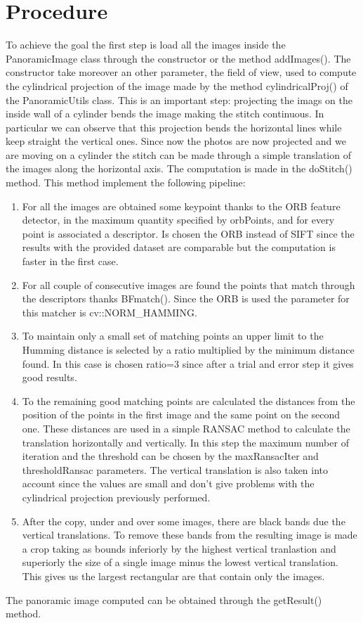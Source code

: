 \documentclass[11pt,a4paper]{article}
\newcommand{\cc}{\fontfamily{txtt}\selectfont}
\begin{document}
\section{Procedure}
To achieve the goal the first step is load all the images inside the {\cc PanoramicImage} class through the constructor or the method {\cc addImages()}. The constructor take moreover an other parameter, the field of view, used to compute the cylindrical projection of the image made by the method {\cc cylindricalProj()} of the {\cc PanoramicUtils} class. This is an important step: projecting the imags on the inside wall of a cylinder bends the image making the stitch continuous. In particular we can observe that this projection bends the horizontal lines while keep straight the vertical ones.
Since now the photos are now projected and we are moving on a cylinder the stitch can be made through a simple translation of the images along the horizontal axis. The computation is made in the {\cc doStitch()} method. This method implement the following pipeline:
\begin{enumerate}
\item For all the images are obtained some keypoint thanks to the ORB feature detector, in the maximum quantity specified by {\cc orbPoints}, and for every point is associated a descriptor. Is chosen the ORB instead of SIFT since the results with the provided dataset are comparable but the computation is faster in the first case.
\item For all couple of consecutive images are found the points that match through the descriptors thanks {\cc BFmatch()}. Since the ORB is used the parameter for this matcher is {\cc cv::NORM\_HAMMING}. 
\item To maintain only a small set of matching points an upper limit to the Humming distance is selected by a {\cc ratio} multiplied by the minimum distance found. In this case is chosen {\cc ratio}=3 since after a trial and error step it gives good results.
\item To the remaining good matching points are calculated the distances from the position of the points in the first image and the same point on the second one. These distances are used in a simple RANSAC method to calculate the translation horizontally and vertically. In this step the maximum number of iteration and the threshold can be chosen by the {\cc maxRansacIter} and {\cc thresholdRansac} parameters. The vertical translation is also taken into account since the values are small and don't give problems with the cylindrical projection previously performed.
\item After the copy, under and over some images, there are black bands due the vertical translations. To remove these bands from the resulting image is made a crop taking as bounds inferiorly by the highest vertical tranlastion and superiorly the size of a single image minus the lowest vertical translation. This gives us the largest rectangular are that contain only the images.
\end{enumerate}
The panoramic image computed can be obtained through the {\cc getResult()} method. 
\end{document}
